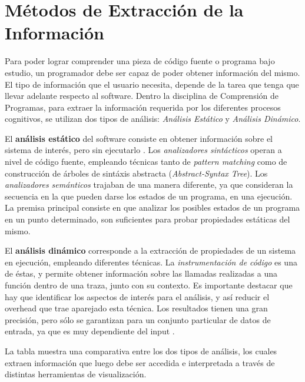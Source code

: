 \section{Métodos de Extracción de la Información}

Para poder lograr comprender una pieza de código fuente o programa bajo estudio, un
programador debe ser capaz de poder obtener información del mismo.
El tipo de información que el usuario necesita, depende de la tarea que tenga que llevar
adelante respecto al software.
Dentro la disciplina de Comprensión de Programas, para extraer la información requerida 
por los diferentes procesos cognitivos, se utilizan dos tipos de análisis:
\textit{Análisis Estático} y \textit{Análisis Dinámico}.

El \textbf{análisis estático} del software consiste en obtener información sobre el 
sistema de interés, pero sin ejecutarlo \cite{Binkley07}.
Los \textit{analizadores sintácticos} operan a nivel de código fuente, empleando
técnicas tanto de \textit{pattern matching} como de construcción de árboles de sintáxis
abstracta (\textit{Abstract-Syntax Tree}).
Los \textit{analizadores semánticos} trajaban de una manera diferente, ya que consideran
la secuencia en la que pueden darse los estados de un programa, en una ejecución.
La premisa principal consiste en que analizar los posibles estados de un programa en un
punto determinado, son suficientes para probar propiedades estáticas del mismo.
\cite{Cousot77}

El \textbf{análisis dinámico} corresponde a la extracción de propiedades de un sistema
en ejecución, empleando diferentes técnicas.
La \textit{instrumentación de código} es una de éstas, y permite obtener información sobre
las llamadas realizadas a una función dentro de una traza, junto con su contexto.
Es importante destacar que hay que identificar los aspectos de interés para el análisis,
y así reducir el overhead que trae aparejado esta técnica.
Los resultados tienen una gran precisión, pero sólo se garantizan para un conjunto particular
de datos de entrada, ya que es muy dependiente del input \cite{Ball99}.

La tabla  muestra una comparativa \cite{GosainSharma15} 
entre los dos tipos de análisis, los cuales extraen información que luego debe ser
accedida e interpretada a través de distintas herramientas de visualización.

